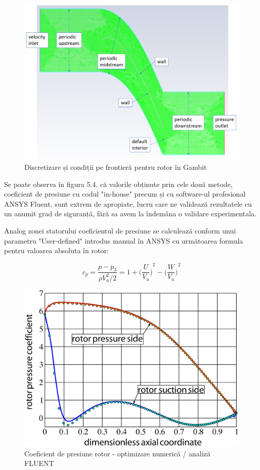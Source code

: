 \begin{figure}[h]
	\centering
	\includegraphics[scale=0.5]{figures/mesh-rotor-boundary.PNG}
	\caption{Discretizare și condiții pe frontieră pentru rotor în Gambit}
	\label{Discretizare și condiții pe frontieră pentru rotor în Gambit}
\end{figure}

Se poate observa în figura 5.4. că valorile obținute prin cele două metode, coeficient de presiune cu codul "in-house" precum și cu software-ul profesional ANSYS Fluent, sunt extrem de apropiate, lucru care ne validează rezultatele cu un anumit grad de siguranță, fără sa avem la îndemâna o validare experimentala.

Analog zonei statorului coeficientul de presiune se calculează conform unui parametru "User-defined" introdus manual în ANSYS cu următoarea formula pentru valoarea absoluta în rotor:

\begin{equation}
c_p = \frac{p-p_3}{\rho V_a^2 / 2} = 1 + {\Big(\frac{U}{V_a}\Big)}^2 - {\Big(\frac{W}{V_a}\Big)}^2
\end{equation}


\begin{figure}[t!]
	\centering
	\includegraphics[scale=0.4]{figures/cp-rotor-ezdraw.eps}
	\caption{Coeficient de presiune rotor - optimizare numerică / analiză FLUENT}
	\label{Coeficient de presiune rotor - optimizare numerică / analiză FLUENT}
\end{figure}

